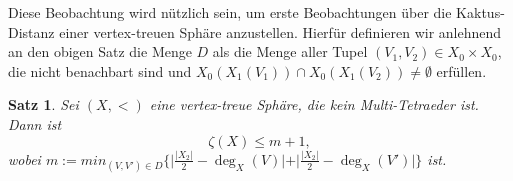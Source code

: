 \documentclass[12pt,titlepage,twoside,cleardoublepage]{article}
\theoremstyle{nummermitklammern}
\newtheorem{satz}[temp]{Satz}
\newtheorem{satz}[zahl]{Satz}
\numberwithin{equation}{section}
\begin{document}

Diese Beobachtung wird nützlich sein, um erste Beobachtungen über die Kaktus-Distanz einer vertex-treuen Sphäre anzustellen. Hierfür definieren wir anlehnend an den obigen Satz die Menge $D$ als die Menge aller Tupel $(V_1,V_2)\in X_0 \times X_0$, die nicht benachbart sind und $ X_0(X_1(V_1))\cap X_0(X_1(V_2))\neq \emptyset$ erfüllen.
\begin{satz}
Sei $(X,<)$ eine vertex-treue Sphäre, die kein Multi-Tetraeder ist. Dann ist 
\[
\zeta(X)\leq m+1,
\] wobei $m:=min_{(V,V')\in D}\{\vert\frac{\vert X_2 \vert}{2}-\deg_X(V)\vert +\vert \frac{\vert X_2 \vert}{2}-\deg_X(V')\vert\}$
 ist.
\end{satz}
\end{document}
